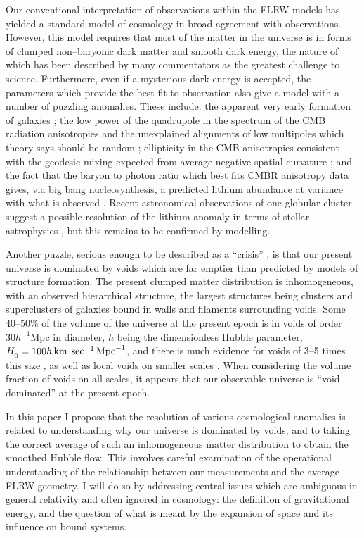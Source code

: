 \documentclass[12pt]{article}
\begin{document}
Our conventional interpretation of observations within the FLRW models
has yielded a standard model of cosmology in broad agreement with
observations. However, this model requires that most of the matter in
the universe is in forms of clumped non--baryonic dark matter and
smooth dark energy, the nature of which has been described by many
commentators as the greatest challenge to science. Furthermore,
even if a mysterious dark energy is accepted, the parameters which provide
the best fit to
observation also give a model with a number of puzzling anomalies. These
include: the apparent very early formation of galaxies \cite{red}; the low
power of the quadrupole in the spectrum of the CMB radiation anisotropies
and the unexplained alignments of low multipoles which theory says should be
random \cite{axis}; ellipticity in the CMB anisotropies consistent with
the geodesic mixing expected from average negative spatial curvature
\cite{elliptic2}; and the fact that the baryon to photon ratio
which best fits CMBR anisotropy data \cite{wmap} gives, via big bang
nucleosynthesis, a predicted lithium abundance at variance with what is
observed \cite{lithium}. Recent astronomical observations of one globular
cluster suggest a possible resolution of the lithium anomaly in terms of
stellar astrophysics \cite{lithium2}, but this remains to be confirmed by
modelling.

Another puzzle, serious enough to be described as a ``crisis'' \cite{P_void},
is that our present universe is dominated by
voids which are far emptier than predicted by models of structure formation.
The present clumped matter distribution is inhomogeneous, with an observed
hierarchical structure, the largest structures being clusters and
superclusters of galaxies bound in walls and filaments surrounding voids.
Some 40--50\% of the volume \cite{HV} of the universe at the present epoch
is in voids of order $30h^{-1}$Mpc in diameter, $h$ being the dimensionless
Hubble parameter, $\Hm=100h\kmsMpc$, and there is much evidence for voids
of 3--5 times this size \cite{Tom1}, as well as local voids on smaller scales
\cite{minivoids}. When
considering the volume fraction of voids on all scales, it appears that our
observable universe is ``void--dominated'' at the present epoch.

In this paper I propose that the resolution of various cosmological
anomalies is related to understanding why our universe is dominated by
voids, and to taking the correct average of such an inhomogeneous matter
distribution to obtain the smoothed Hubble flow. This involves careful
examination of the operational understanding of the relationship between
our measurements and the average FLRW geometry. I will do so by addressing
central issues which are ambiguous in general relativity and often ignored
in cosmology: the definition of gravitational energy, and the question of
what is meant by the expansion of space and its influence on bound systems.
\end{document}
